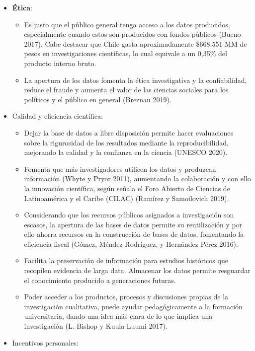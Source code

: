 \documentclass[
  spanish,
  letterpaper,
  DIV=11,
  numbers=noendperiod]{scrreprt}
\begin{document}
\begin{itemize}
\item
  \textbf{Ética}:

  \begin{itemize}
  \item
    Es justo que el público general tenga acceso a los datos producidos,
    especialmente cuando estos son producidos con fondos públicos (Bueno
    2017). Cabe destacar que Chile gasta aproximadamente \$668.551 MM de
    pesos en investigaciones científicas, lo cual equivale a un 0,35\%
    del producto interno bruto.
  \item
    La apertura de los datos fomenta la ética investigativa y la
    confiabilidad, reduce el fraude y aumenta el valor de las ciencias
    sociales para los políticos y el público en general (Breznau 2019).
  \end{itemize}
\item
  Calidad y eficiencia científica:

  \begin{itemize}
  \item
    Dejar la base de datos a libre disposición permite hacer
    evaluaciones sobre la rigurosidad de los resultados mediante la
    reproducibilidad, mejorando la calidad y la confianza en la ciencia
    (UNESCO 2020).
  \item
    Fomenta que más investigadores utilicen los datos y produzcan
    información (Whyte y Pryor 2011), aumentando la colaboración y con
    ello la innovación científica, según señala el Foro Abierto de
    Ciencias de Latinoamérica y el Caribe (CILAC) (Ramírez y Samoilovich
    2019).
  \item
    Considerando que los recursos públicos asignados a investigación son
    escasos, la apertura de las bases de datos permite su reutilización
    y por ello ahorra recursos en la construcción de bases de datos,
    fomentando la eficiencia fiscal (Gómez, Méndez Rodríguez, y
    Hernández Pérez 2016).
  \item
    Facilita la preservación de información para estudios históricos que
    recopilen evidencia de larga data. Almacenar los datos permite
    resguardar el conocimiento producido a generaciones futuras.
  \item
    Poder acceder a los productos, procesos y discusiones propias de la
    investigación cualitativa, puede ayudar pedagógicamente a la
    formación universitaria, dando una idea más clara de lo que implica
    una investigación (L. Bishop y Kuula-Luumi 2017).
  \end{itemize}
\item
  Incentivos personales:


\end{itemize}
\end{document}
